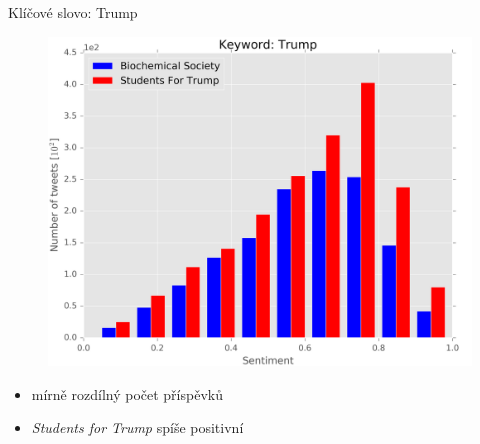 \documentclass[notheorems,12pt]{beamer}
\begin{document}
\begin{frame}{Klíčové slovo: Trump}
    \begin{figure}
        \centering
        \includegraphics[scale=0.37]{./Pics/trump.png}
    \end{figure}
    \vspace{-0.4cm}
    \begin{itemize}
        \item mírně rozdílný počet příspěvků
        \item \textit{Students for Trump} spíše positivní
    \end{itemize}
\end{frame}
\end{document}
